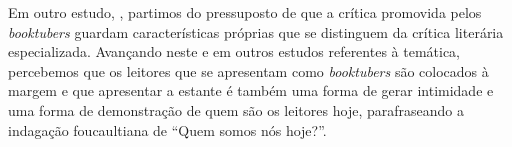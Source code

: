 Em outro estudo, \textcite{vizibeli_contrastes_2016}, partimos do pressuposto de que a crítica promovida pelos \textit{booktubers} guardam características próprias que se distinguem da crítica literária especializada. Avançando neste e em outros estudos referentes à temática, percebemos que os leitores que se
apresentam como \textit{booktubers} são colocados à margem e que
apresentar a estante é também uma forma de gerar intimidade e uma forma
de demonstração de quem são os leitores hoje, parafraseando a indagação
foucaultiana de \enquote{Quem somos nós hoje?}.